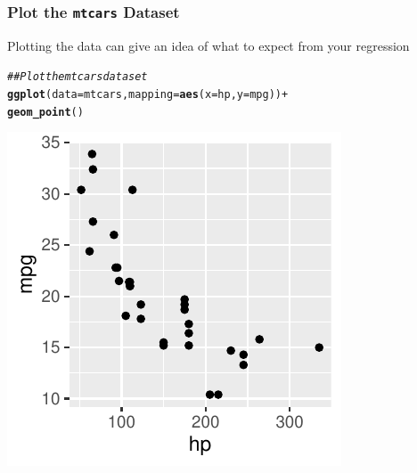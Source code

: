 \documentclass{beamer}\usepackage[]{graphicx}\usepackage[]{xcolor}
\makeatletter
\def\maxwidth{ %
  \ifdim\Gin@nat@width>\linewidth
    \linewidth
  \else
    \Gin@nat@width
  \fi
}
\newcommand{\hlcom}[1]{\textcolor[rgb]{0.678,0.584,0.686}{\textit{#1}}}%
\newcommand{\hlopt}[1]{\textcolor[rgb]{0,0,0}{#1}}%
\newcommand{\hlstd}[1]{\textcolor[rgb]{0.345,0.345,0.345}{#1}}%
\newcommand{\hlkwc}[1]{\textcolor[rgb]{0.333,0.667,0.333}{#1}}%
\newcommand{\hlkwd}[1]{\textcolor[rgb]{0.737,0.353,0.396}{\textbf{#1}}}%
\newenvironment{kframe}{%
 \def\at@end@of@kframe{}%
 \ifinner\ifhmode%
  \def\at@end@of@kframe{\end{minipage}}%
  \begin{minipage}{\columnwidth}%
 \fi\fi%
 \def\FrameCommand##1{\hskip\@totalleftmargin \hskip-\fboxsep
 \colorbox{shadecolor}{##1}\hskip-\fboxsep
     \hskip-\linewidth \hskip-\@totalleftmargin \hskip\columnwidth}%
 \MakeFramed {\advance\hsize-\width
   \@totalleftmargin\z@ \linewidth\hsize
   \@setminipage}}%
 {\par\unskip\endMakeFramed%
 \at@end@of@kframe}
\newenvironment{knitrout}{}{} %
\makeatother
\begin{document}
\begin{frame}[fragile]\frametitle{Plot the \texttt{mtcars} Dataset}
    Plotting the data can give an idea of what to expect from your regression
\begin{knitrout}\footnotesize
{}\color{fgcolor}\begin{kframe}
\begin{alltt}
\hlcom{## Plot the mtcars dataset}
\hlkwd{ggplot}\hlstd{(}\hlkwc{data} \hlstd{= mtcars,} \hlkwc{mapping} \hlstd{=} \hlkwd{aes}\hlstd{(}\hlkwc{x} \hlstd{= hp,} \hlkwc{y} \hlstd{= mpg))} \hlopt{+}
  \hlkwd{geom_point}\hlstd{()}
\end{alltt}
\end{kframe}

{\centering \includegraphics[width=\maxwidth]{figure/unnamed-chunk-47-1} 

}


\end{knitrout}
\end{frame}
\end{document}
